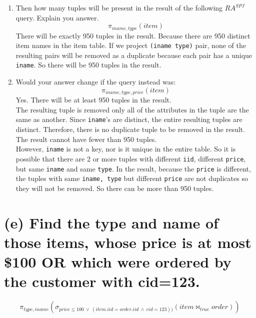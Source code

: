 \documentclass{article}
\begin{document}
\begin{enumerate}
\item  Then how many tuples will be present in the result of the following \(RA^{SPJ}\) query. Explain you answer.
\[
\pi_{iname, type}(item)
\]
There will be exactly 950 tuples in the result. Because there are 950 distinct item names in the item table. If we project \texttt{(iname type)} pair, none of the resulting pairs will be removed as a duplicate because each pair has a unique \texttt{iname}. So there will be 950 tuples in the result.\\

\item Would your answer change if the query instead was:
\[
\pi_{iname, type, price}(item)
\]
Yes. There will be at least 950 tuples in the result.\\

The resulting tuple is removed only all of the attributes in the tuple are the same as another. Since \texttt{iname}'s are distinct, the entire resulting tuples are distinct. Therefore, there is no duplicate tuple to be removed in the result. The result cannot have fewer than 950 tuples.\\

However, \texttt{iname} is not a key, nor is it unique in the entire table. So it is possible that there are 2 or more tuples with different \texttt{iid}, different \texttt{price}, but same \texttt{iname} and same \texttt{type}. In the result, because the \texttt{price} is different, the tuples with same \texttt{iname, type} but different \texttt{price} are not duplicates so they will not be removed. So there can be more than 950 tuples.



\end{enumerate}

\section{(e) Find the type and name of those items, whose price is at most \$100 OR which were ordered
by the customer with cid=123.}

\[
\pi_{type, iname}(\sigma_{price \leq 100 \ \vee \  (item.iid = order.iid \ \wedge \ cid=123))}(item \bowtie_{true} order))
\]
\\
\end{document}
